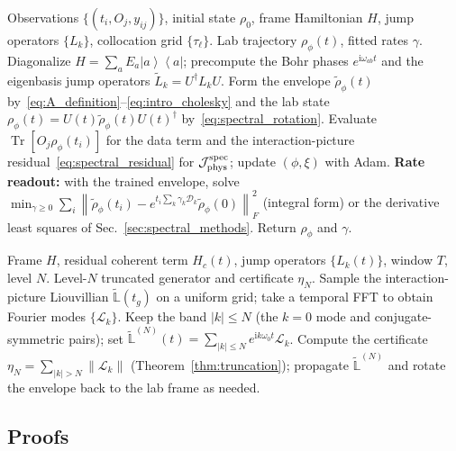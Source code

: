\documentclass[11pt]{article}
\DeclareMathOperator{\Tr}{Tr}
\newcommand{\calJ}{\mathcal{J}}
\newcommand{\calD}{\mathcal{D}}
\newcommand{\calL}{\mathcal{L}}
\newcommand{\ii}{\mathrm{i}}
\newcommand{\norm}[1]{\left\lVert #1 \right\rVert}
\newcommand{\ket}[1]{\left\lvert #1 \right\rangle}
\newcommand{\bra}[1]{\left\langle #1 \right\rvert}
\newcommand{\proj}[1]{\ket{#1}\!\bra{#1}}
\newcommand{\rhophi}{\rho_{\phi}}
\begin{document}
\begin{algorithm}[h]
\caption{Spectral-frame training and rate readout}
\label{alg:spectral}
\begin{algorithmic}[1]
\REQUIRE Observations $\{(t_i,O_j,y_{ij})\}$, initial state $\rho_0$, frame Hamiltonian $H$, jump operators $\{L_k\}$, collocation grid $\{\tau_\ell\}$.
\ENSURE Lab trajectory $\rhophi(t)$, fitted rates $\gamma$.
\STATE Diagonalize $H=\sum_aE_a\proj{a}$; precompute the Bohr phases $e^{\ii\omega_{ab}t}$ and the eigenbasis jump operators $\widetilde L_k=U^\dagger L_kU$.
    \STATE Form the envelope $\widetilde\rho_\phi(t)$ by~\eqref{eq:A_definition}--\eqref{eq:intro_cholesky} and the lab state $\rhophi(t)=U(t)\widetilde\rho_\phi(t)U(t)^\dagger$ by~\eqref{eq:spectral_rotation}.
    \STATE Evaluate $\Tr[O_j\rhophi(t_i)]$ for the data term and the interaction-picture residual~\eqref{eq:spectral_residual} for $\calJ_{\rm phys}^{\rm spec}$; update $(\phi,\xi)$ with Adam.
\ENDFOR
\STATE \textbf{Rate readout:} with the trained envelope, solve $\min_{\gamma\ge0}\sum_i\norm{\widetilde\rho_\phi(t_i)-e^{t_i\sum_k\gamma_k\calD_k}\widetilde\rho_\phi(0)}_F^2$ (integral form) or the derivative least squares of Sec.~\ref{sec:spectral_methods}.
\STATE Return $\rhophi$ and $\gamma$.
\end{algorithmic}
\end{algorithm}

\begin{algorithm}[h]
\caption{Operator-system spectral truncation of the generator}
\label{alg:truncation}
\begin{algorithmic}[1]
\REQUIRE Frame $H$, residual coherent term $H_c(t)$, jump operators $\{L_k(t)\}$, window $T$, level $N$.
\ENSURE Level-$N$ truncated generator and certificate $\eta_N$.
\STATE Sample the interaction-picture Liouvillian $\widetilde{\mathbb L}(t_g)$ on a uniform grid; take a temporal FFT to obtain Fourier modes $\{\calL_k\}$.
\STATE Keep the band $|k|\le N$ (the $k{=}0$ mode and conjugate-symmetric pairs); set $\widetilde{\mathbb L}^{(N)}(t)=\sum_{|k|\le N}e^{\ii k\omega_0 t}\calL_k$.
\STATE Compute the certificate $\eta_N=\sum_{|k|>N}\norm{\calL_k}$ (Theorem~\ref{thm:truncation}); propagate $\widetilde{\mathbb L}^{(N)}$ and rotate the envelope back to the lab frame as needed.
\end{algorithmic}
\end{algorithm}

\subsection{Proofs}
\label{sec:appendix_proofs}
\end{document}
